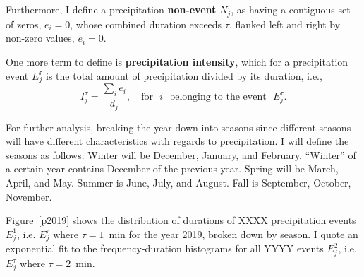\documentclass[11pt]{report}
\newcommand{\fracd}[2]{\frac{\displaystyle{#1}}{\displaystyle{#2}}}
\begin{document}
Furthermore, I define a precipitation \textbf{non-event} $N_j^\tau$,
  as having a contiguous set of zeros, $e_i=0$, whose combined duration
  exceeds $\tau$, flanked left and right by non-zero values, $e_i=0$.

One more term to define is \textbf{precipitation intensity}, which for
a precipitation event $E_j^\tau$ is the total amount of precipitation
divided by its duration, i.e., 
\begin{equation}
I_j^\tau = \fracd{\sum_i e_i }{d_j} ,
\quad
\mbox{for}\,\,\,\, i\,\,\,\, \mbox{belonging to the event}\,\,\,\, E_j^\tau
.
\end{equation}


For further analysis, breaking the year down into seasons since
different seasons will have different characteristics with regards to
precipitation. I will define the seasons as follows: Winter will be
December, January, and February. ``Winter'' of a certain year contains
December of the previous year.  Spring will be March, April, and
May. Summer is June, July, and August. Fall is September, October,
November.

Figure~\ref{p2019} shows the distribution of durations of XXXX
precipitation events $E_j^1$, i.e. $E_j^\tau$ where $\tau=1$~min for
the year 2019, broken down by season. I quote an exponential fit to
the frequency-duration histograms for all YYYY events $E_j^2$,
i.e. $E_j^\tau$ where $\tau=2$~min.
\end{document}
